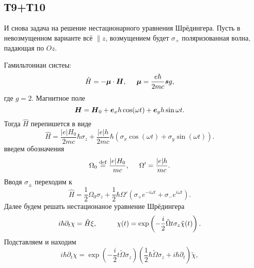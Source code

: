 
\subsection*{Т9+Т10}

И снова задача на решение нестационарного уравнения Шрёдингера. Пусть в невозмущенном варианте всё $\parallel z$, возмущением будет $\sigma_+$ поляризованная волна, падающая по $Oz$. 

Гамильтониан систеы:
\begin{equation*}
    \hat{H} = - \mbox{\boldmath $\mu$} \cdot \mbox{\boldmath $H$},
    \hspace{5 mm} 
    \mbox{\boldmath $\mu$} = \frac{e \hbar}{2 m c} \mbox{\boldmath $s$} g,
\end{equation*}
где $g = 2$. Магнитное поле
\begin{equation*}
    \mbox{\boldmath $H$} = \mbox{\boldmath $H$}_0 + \mbox{\boldmath $e$}_x h \cos (\omega t) + \mbox{\boldmath $e$}_y h \sin \omega t.
\end{equation*}
Тогда $\hat{H}$ перепишется в виде
\begin{equation*}
    \hat{H} = \frac{|e| H_0}{2 m c} \hbar \sigma_z + \frac{|e| h}{2 m c} \hbar \left(\sigma_x \cos (\omega t) + \sigma_y \sin(\omega t) \right).
\end{equation*}
введем обозначения
\begin{equation*}
    \Omega_0 \overset{\mathrm{def}}{=} \frac{|e| H_0}{m c},
    \hspace{5 mm} 
    \Omega' = \frac{|e| h}{mc}.
\end{equation*}
Вводя $\sigma_\pm$ переходим к
\begin{equation*}
    \hat{H} = \frac{1}{2} \Omega_0 \sigma_z + \frac{1}{2} \hbar \Omega' \left(
        \sigma_+ e^{- i \omega t} + \sigma_{-} e^{i \omega t}
    \right).
\end{equation*}
Далее будем решать нестационаное уравнение Шрёдингера
\begin{equation*}
    i \hbar \partial_t \chi = \hat{H} \xi,
    \hspace{10 mm} 
    \chi(t) = \exp\left(
        - \frac{i}{2} \tilde{\Omega} t \sigma_z \tilde{\chi}(t)
    \right).
\end{equation*}
Подставляем и находим
\begin{equation*}
    i \hbar \partial_t \chi = \exp\left(
        - \frac{i}{2} t \tilde{\Omega} \sigma_z
    \right) \left(
        \frac{1}{2} \hbar \tilde{\Omega} \sigma_z + i \hbar \partial_t
    \right) \tilde{\chi},
\end{equation*}
